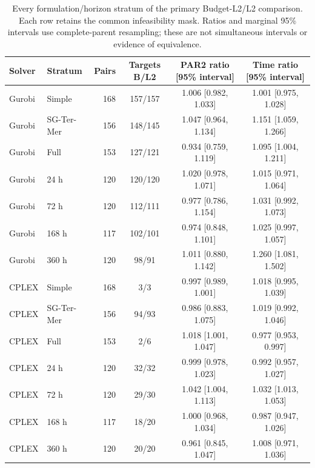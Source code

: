 \begin{table}[htbp]
\centering\scriptsize\setlength{\tabcolsep}{3pt}
\caption{Every formulation/horizon stratum of the primary Budget-L2/L2
comparison. Each row retains the common infeasibility mask. Ratios and marginal
95\% intervals use complete-parent resampling; these are not simultaneous
intervals or evidence of equivalence.}
\label{tab:orf-large-strata}
\begin{tabular}{llrccc}\toprule
Solver & Stratum & Pairs & Targets B/L2 & PAR2 ratio [95\% interval] & Time ratio [95\% interval]\\\midrule
Gurobi & Simple & 168 & 157/157 & 1.006 [0.982, 1.033] & 1.001 [0.975, 1.028]\\
Gurobi & SG-Ter-Mer & 156 & 148/145 & 1.047 [0.964, 1.134] & 1.151 [1.059, 1.266]\\
Gurobi & Full & 153 & 127/121 & 0.934 [0.759, 1.119] & 1.095 [1.004, 1.211]\\
Gurobi & 24 h & 120 & 120/120 & 1.020 [0.978, 1.071] & 1.015 [0.971, 1.064]\\
Gurobi & 72 h & 120 & 112/111 & 0.977 [0.786, 1.154] & 1.031 [0.992, 1.073]\\
Gurobi & 168 h & 117 & 102/101 & 0.974 [0.848, 1.101] & 1.025 [0.997, 1.057]\\
Gurobi & 360 h & 120 & 98/91 & 1.011 [0.880, 1.142] & 1.260 [1.081, 1.502]\\
CPLEX & Simple & 168 & 3/3 & 0.997 [0.989, 1.001] & 1.018 [0.995, 1.039]\\
CPLEX & SG-Ter-Mer & 156 & 94/93 & 0.986 [0.883, 1.075] & 1.019 [0.992, 1.046]\\
CPLEX & Full & 153 & 2/6 & 1.018 [1.001, 1.047] & 0.977 [0.953, 0.997]\\
CPLEX & 24 h & 120 & 32/32 & 0.999 [0.978, 1.023] & 0.992 [0.957, 1.027]\\
CPLEX & 72 h & 120 & 29/30 & 1.042 [1.004, 1.113] & 1.032 [1.013, 1.053]\\
CPLEX & 168 h & 117 & 18/20 & 1.000 [0.968, 1.034] & 0.987 [0.947, 1.026]\\
CPLEX & 360 h & 120 & 20/20 & 0.961 [0.845, 1.047] & 1.008 [0.971, 1.036]\\
\bottomrule\end{tabular}\end{table}
